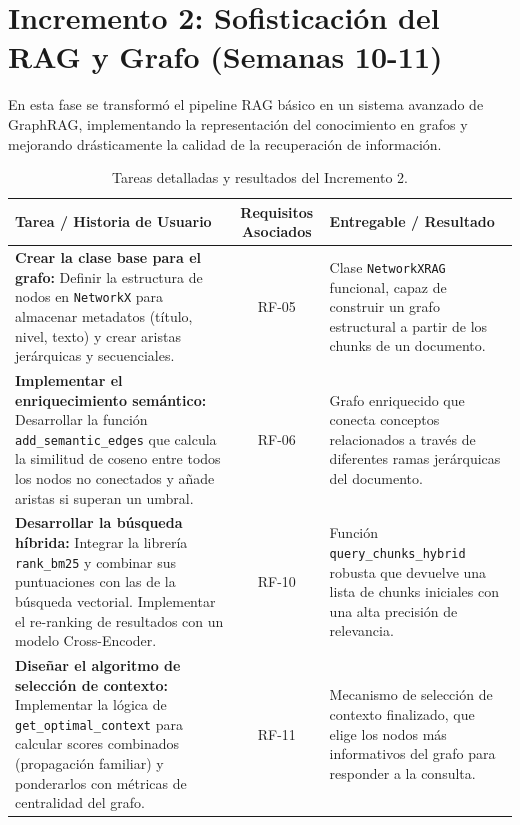 \newpage
\section*{Incremento 2: Sofisticación del RAG y Grafo (Semanas 10-11)}
En esta fase se transformó el pipeline RAG básico en un sistema avanzado de GraphRAG, implementando la representación del conocimiento en grafos y mejorando drásticamente la calidad de la recuperación de información.

\begin{table}[H]
    \centering
    \renewcommand{\arraystretch}{1.3}
    \caption{Tareas detalladas y resultados del Incremento 2.}
    \label{tab:incremento2_detallado}
    \begin{tabularx}{\textwidth}{|X|c|X|}
    \hline
    \textbf{Tarea / Historia de Usuario} & \textbf{Requisitos Asociados} & \textbf{Entregable / Resultado} \\
    \hline
    \textbf{Crear la clase base para el grafo:} Definir la estructura de nodos en \texttt{NetworkX} para almacenar metadatos (título, nivel, texto) y crear aristas jerárquicas y secuenciales. & RF-05 & Clase \texttt{NetworkXRAG} funcional, capaz de construir un grafo estructural a partir de los chunks de un documento. \\
    \hline
    \textbf{Implementar el enriquecimiento semántico:} Desarrollar la función \texttt{add\_semantic\_edges} que calcula la similitud de coseno entre todos los nodos no conectados y añade aristas si superan un umbral. & RF-06 & Grafo enriquecido que conecta conceptos relacionados a través de diferentes ramas jerárquicas del documento. \\
    \hline
    \textbf{Desarrollar la búsqueda híbrida:} Integrar la librería \texttt{rank\_bm25} y combinar sus puntuaciones con las de la búsqueda vectorial. Implementar el re-ranking de resultados con un modelo Cross-Encoder. & RF-10 & Función \texttt{query\_chunks\_hybrid} robusta que devuelve una lista de chunks iniciales con una alta precisión de relevancia. \\
    \hline
    \textbf{Diseñar el algoritmo de selección de contexto:} Implementar la lógica de \texttt{get\_optimal\_context} para calcular scores combinados (propagación familiar) y ponderarlos con métricas de centralidad del grafo. & RF-11 & Mecanismo de selección de contexto finalizado, que elige los nodos más informativos del grafo para responder a la consulta. \\
    \hline
    \end{tabularx}
\end{table}

